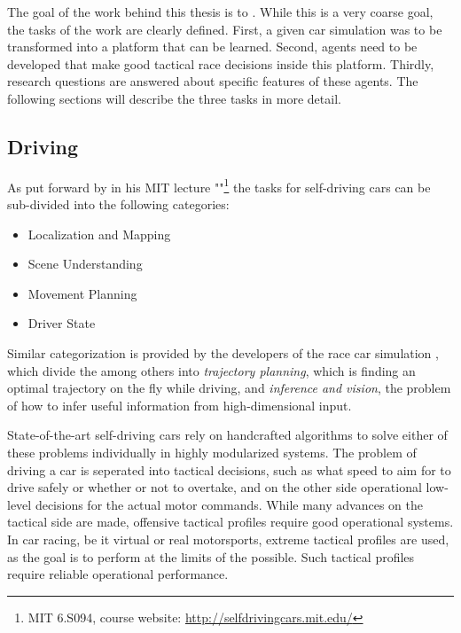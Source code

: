 The goal of the work behind this thesis is to . While this is a very coarse goal, the tasks of the work are clearly defined. First, a given car simulation was to be transformed into a platform that can be learned. Second, agents need to be developed that make good tactical race decisions inside this platform. Thirdly, research questions are answered about specific features of these agents. The following sections will describe the three tasks in more detail.

\subsection{Driving}

As put forward by  in his MIT lecture ""\footnote{MIT 6.S094, course website: \url{http://selfdrivingcars.mit.edu/}} the tasks for self-driving cars can be sub-divided into the following categories: 
\begin{itemize} 
	\item Localization and Mapping
	\item Scene Understanding
	\item Movement Planning
	\item Driver State
\end{itemize}

Similar categorization is provided by the developers of the race car simulation \cite{wymann_torcs_2015}, which divide the  among others into \textit{trajectory planning}, which is finding an optimal trajectory on the fly while driving, and \textit{inference and vision}, the problem of how to infer useful information from high-dimensional input.

State-of-the-art self-driving cars rely on handcrafted algorithms to solve either of these problems individually in highly modularized systems. The problem of driving a car is seperated into tactical decisions, such as what speed to aim for to drive safely or whether or not to overtake, and on the other side operational low-level decisions for the actual motor commands. While many advances on the tactical side are made, offensive tactical profiles require good operational systems. In car racing, be it virtual or real motorsports, extreme tactical profiles are used, as the goal is to perform at the limits of the possible. Such tactical profiles require reliable operational performance.

